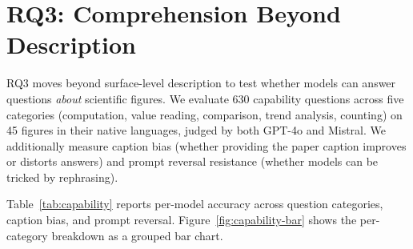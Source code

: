 \section{RQ3: Comprehension Beyond Description}\label{sec:rq3-results}

RQ3 moves beyond surface-level description to test whether models can answer questions \emph{about} scientific figures.
We evaluate 630 capability questions across five categories (computation, value reading, comparison, trend analysis, counting) on 45 figures in their native languages, judged by both GPT-4o and Mistral.
We additionally measure caption bias (whether providing the paper caption improves or distorts answers) and prompt reversal resistance (whether models can be tricked by rephrasing).

Table~\ref{tab:capability} reports per-model accuracy across question categories, caption bias, and prompt reversal.
Figure~\ref{fig:capability-bar} shows the per-category breakdown as a grouped bar chart.

